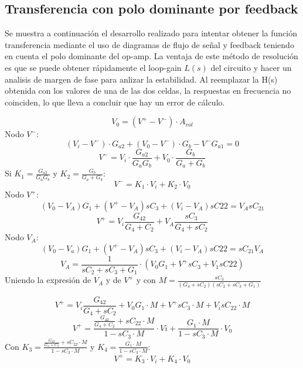 \documentclass[../../tc_tp5_main.tex]{subfiles}
\begin{document}
\subsection{Transferencia con polo dominante por feedback}

Se muestra a continuaci\'on el desarrollo realizado para intentar obtener la funci\'on transferencia mediante el uso de diagramas de flujo de se\~nal y feedback teniendo en cuenta el polo dominante del op-amp. La ventaja de este m\'etodo de resoluci\'on es que se puede obtener r\'apidamente el loop-gain $L(s)$ del circuito y hacer un analisis de margen de fase para anlizar la estabilidad. Al reemplazar la H(s) obtenida con los valores de una de las dos celdas, la respuestas en frecuencia no coinciden, lo que lleva a concluir que hay un error de c\'alculo.

\begin{equation}
	V_0 = (V^+ - V^-)\cdot A_{vol}
\end{equation}
Nodo $V^-$:
\begin{equation}
	(V_i-V^-)\cdot G_{a2} + (V_0 - V^-)\cdot G_b - V^-  G_{a1} = 0
\end{equation}
\begin{equation}	
	V^- = V_i \cdot \frac{G_{a2}}{G_a G_b} + V_0\cdot \frac{G_b}{G_a+G_b}
\end{equation}
Si $K_1 = \frac{G_{a2}}{G_a G_b}$ y $K_2 = \frac{G_b}{G_a+G_b}$:
\begin{equation}
	V^-=K_1\cdot V_i + K_2 \cdot V_0
\end{equation}
Nodo $V^+$:
\begin{equation}
(V_0-V_A)G_1+(V^+-V_A)sC_3+(V_i-V_A)sC{22} = V_AsC_{21}
\end{equation}
\begin{equation}
V^+=V_i\frac{G_{42}}{G_4+C_2}+V_A\frac{sC_3}{G_4+sC_2}
\end{equation}
Nodo $V_A$:
\begin{equation}
(V_0-V_a)G_1+(V^+-V_A)sC_3+(V_i-V_A)sC{22}=sC_{21}V_A
\end{equation}
\begin{equation}
V_A = \frac{1}{sC_2+sC_3+G_1}\cdot(V_0G_1+V^+sC_3+V_1sC{22})
\end{equation}
Uniendo la expresi\'on de $V_A$ y de $V^+$ y con $M=\frac{sC_3}{(G_4+sC_2)(sC_2+sC_3+G_1)}$

\begin{equation}
V^+=V_i\frac{G_{42}}{G_4+sC_2}+V_0G_1\cdot M+V^+sC_3\cdot M + V_i sC_{22}\cdot M
\end{equation}
\begin{equation}
V^+=\frac{\frac{G_{42}}{G_4+C_2}+sC_{22}\cdot M}{1-sC_3\cdot M} \cdot Vi + \frac{G_1\cdot M}{1-sC_3\cdot M} \cdot V_0
\end{equation}
Con $K_3 = \frac{\frac{G_{42}}{G_4+C_2}+sC_{22}\cdot M}{1-sC_3\cdot M}$ y $K_4 = \frac{G_1\cdot M}{1-sC_3\cdot M}$:
\begin{equation}
V^+=K_3\cdot V_i+K_4\cdot V_0
\end{equation}
\end{document}
